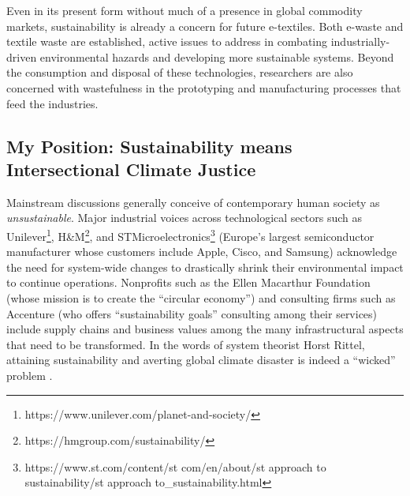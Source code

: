 Even in its present form without much of a presence in global commodity markets, sustainability is already a concern for future e-textiles. Both e-waste \cite{robinson_e-waste:_2009,forti_global_2020} and textile waste \cite{sandin_environmental_2018,muthu_textiles_2017} are established, active issues to address in combating industrially-driven environmental hazards and developing more sustainable systems. Beyond the consumption and disposal of these technologies, researchers are also concerned with wastefulness in the prototyping \cite{dew_designing_2019, wall_scrappy_2021} %
and manufacturing \cite{machado_sustainable_2020, schoggl_narrative_2020}
processes that feed the industries. 

\subsection{My Position: Sustainability means Intersectional Climate Justice}

Mainstream discussions generally conceive of contemporary human society as \textit{unsustainable}. Major industrial voices across technological sectors such as Unilever\footnote{https://www.unilever.com/planet-and-society/}, H\&M\footnote{https://hmgroup.com/sustainability/}, and STMicroelectronics\footnote{https://www.st.com/content/st\textunderscore
com/en/about/st\textunderscore
approach\textunderscore
to\textunderscore
sustainability/st\textunderscore
approach\textunderscore
to\_sustainability.html} (Europe's largest semiconductor manufacturer whose customers include Apple, Cisco, and Samsung) acknowledge the need for system-wide changes to drastically shrink their environmental impact to continue operations. %
Nonprofits such as the Ellen Macarthur Foundation (whose mission is to create the ``circular economy'') and consulting firms such as Accenture (who offers ``sustainability goals'' consulting among their services) include supply chains and business values among the many infrastructural aspects that need to be transformed. In the words of system theorist Horst Rittel, attaining sustainability and averting global climate disaster is indeed a ``wicked'' problem \cite{rittel_dilemmas_1969}.

